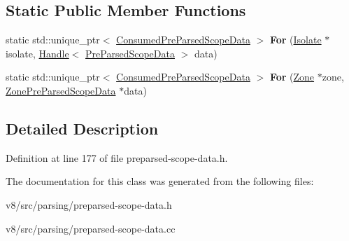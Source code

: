 \subsection*{Static Public Member Functions}
\begin{DoxyCompactItemize}
\item 
\mbox{\label{classv8_1_1internal_1_1ConsumedPreParsedScopeData_a1d735302d49c2128d9d902eeacda62f7}} 
static std\+::unique\+\_\+ptr$<$ \mbox{\hyperlink{classv8_1_1internal_1_1ConsumedPreParsedScopeData}{Consumed\+Pre\+Parsed\+Scope\+Data}} $>$ {\bfseries For} (\mbox{\hyperlink{classv8_1_1internal_1_1Isolate}{Isolate}} $\ast$isolate, \mbox{\hyperlink{classv8_1_1internal_1_1Handle}{Handle}}$<$ \mbox{\hyperlink{classv8_1_1internal_1_1PreParsedScopeData}{Pre\+Parsed\+Scope\+Data}} $>$ data)
\item 
\mbox{\label{classv8_1_1internal_1_1ConsumedPreParsedScopeData_a70f17115f5f3963497ae35c3643d64ee}} 
static std\+::unique\+\_\+ptr$<$ \mbox{\hyperlink{classv8_1_1internal_1_1ConsumedPreParsedScopeData}{Consumed\+Pre\+Parsed\+Scope\+Data}} $>$ {\bfseries For} (\mbox{\hyperlink{classv8_1_1internal_1_1Zone}{Zone}} $\ast$zone, \mbox{\hyperlink{classv8_1_1internal_1_1ZonePreParsedScopeData}{Zone\+Pre\+Parsed\+Scope\+Data}} $\ast$data)
\end{DoxyCompactItemize}


\subsection{Detailed Description}


Definition at line 177 of file preparsed-\/scope-\/data.\+h.



The documentation for this class was generated from the following files\+:\begin{DoxyCompactItemize}
\item 
v8/src/parsing/preparsed-\/scope-\/data.\+h\item 
v8/src/parsing/preparsed-\/scope-\/data.\+cc\end{DoxyCompactItemize}
